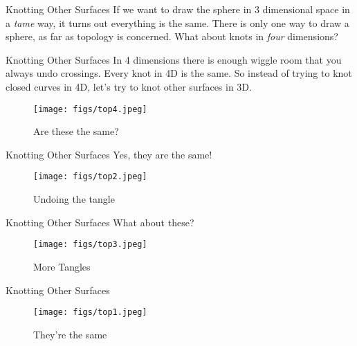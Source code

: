 \documentclass{beamer}
\begin{document}
    \begin{frame}{Knotting Other Surfaces}
        If we want to draw the sphere in 3 dimensional space in a
        \textit{tame} way, it turns out everything is the same. There is
        only one way to draw a sphere, as far as topology is concerned.
        What about knots in \textit{four} dimensions?
    \end{frame}
    \begin{frame}{Knotting Other Surfaces}
        In 4 dimensions there is enough wiggle room that you always
        undo crossings. Every knot in 4D is the same. So instead of
        trying to knot closed curves in 4D, let's try to knot other surfaces
        in 3D.
        \begin{figure}
            \centering
            \texttt{[image: figs/top4.jpeg]}
            \caption{Are these the same?}
            \label{fig:top4}
        \end{figure}
    \end{frame}
    \begin{frame}{Knotting Other Surfaces}
        Yes, they are the same!
        \begin{figure}
            \centering
            \texttt{[image: figs/top2.jpeg]}
            \caption{Undoing the tangle}
            \label{fig:top2}
        \end{figure}
    \end{frame}
    \begin{frame}{Knotting Other Surfaces}
        What about these?
        \begin{figure}
            \centering
            \texttt{[image: figs/top3.jpeg]}
            \caption{More Tangles}
            \label{fig:top3}
        \end{figure}
    \end{frame}
    \begin{frame}{Knotting Other Surfaces}
        \begin{figure}
            \centering
            \texttt{[image: figs/top1.jpeg]}
            \caption{They're the same}
            \label{fig:top1}
        \end{figure}
    \end{frame}
\end{document}
